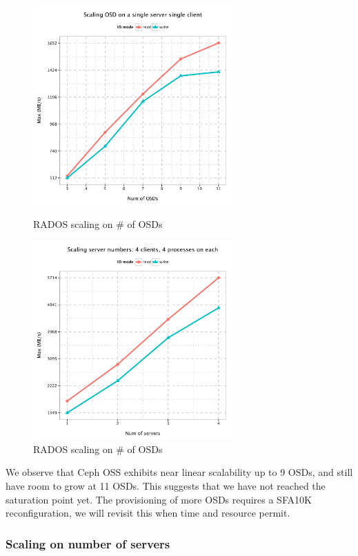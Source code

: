 \documentclass{article}
\begin{document}
\begin{figure}[htb]
\centering
\begin{minipage}[t]{0.5\linewidth}
\centering
\includegraphics[width=3in]{data/rados_osd}
\caption{RADOS scaling on \# of OSDs}
\end{minipage}%
\begin{minipage}[t]{0.5\linewidth}
\centering
\includegraphics[width=3in]{data/rados_server}
\caption{RADOS scaling on \# of OSDs}
\end{minipage}%
\end{figure}

We observe that Ceph OSS exhibits near linear scalability up to 9 OSDs, and
still have room to grow at 11 OSDs. This suggests that we have not reached the
saturation point yet. The provisioning of more OSDs requires a SFA10K
reconfiguration, we will revisit this when time and resource permit.

\subsubsection{Scaling on number of servers}
\end{document}

